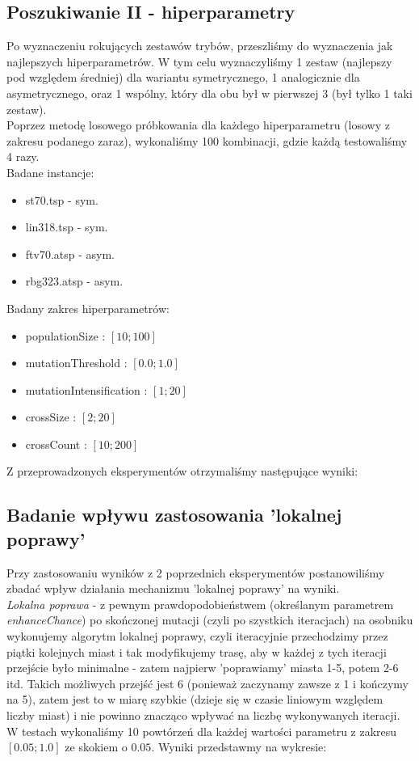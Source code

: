 \documentclass{article}
\begin{document}
\subsection{Poszukiwanie II - hiperparametry}
Po wyznaczeniu rokujących zestawów trybów, przeszliśmy do wyznaczenia jak najlepszych hiperparametrów. W tym celu wyznaczyliśmy 1 zestaw (najlepszy pod względem średniej) dla wariantu symetrycznego, 1 analogicznie dla asymetrycznego, oraz 1 wspólny, który dla obu był w pierwszej 3 (był tylko 1 taki zestaw).\\
Poprzez metodę losowego próbkowania dla każdego hiperparametru (losowy z zakresu podanego zaraz), wykonaliśmy 100 kombinacji, gdzie każdą testowaliśmy 4 razy.\\
Badane instancje:
\begin{itemize}
	\item st70.tsp - sym.
	\item lin318.tsp - sym.
	\item ftv70.atsp - asym.
	\item rbg323.atsp - asym.
\end{itemize}
Badany zakres hiperparametrów:
\begin{itemize}
	\item populationSize : $[10 ; 100]$
	\item mutationThreshold : $[0.0 ; 1.0]$
	\item mutationIntensification : $[1 ; 20]$
	\item crossSize : $[2 ; 20]$
	\item crossCount : $[10 ; 200]$
\end{itemize}
Z przeprowadzonych eksperymentów otrzymaliśmy następujące wyniki:

\subsection{Badanie wpływu zastosowania 'lokalnej poprawy'}
Przy zastosowaniu wyników z 2 poprzednich eksperymentów postanowiliśmy zbadać wpływ działania mechanizmu 'lokalnej poprawy' na wyniki.\\
\textit{Lokalna poprawa} - z pewnym prawdopodobieństwem (określanym parametrem \textit{enhanceChance}) po skończonej mutacji (czyli po szystkich iteracjach) na osobniku wykonujemy algorytm lokalnej poprawy, czyli iteracyjnie przechodzimy przez piątki kolejnych miast i tak modyfikujemy trasę, aby w każdej z tych iteracji przejście było minimalne - zatem najpierw 'poprawiamy' miasta 1-5, potem 2-6 itd. Takich możliwych przejść jest 6 (ponieważ zaczynamy zawsze z 1 i kończymy na 5), zatem jest to w miarę szybkie (dzieje się w czasie liniowym względem liczby miast) i nie powinno znacząco wpływać na liczbę wykonywanych iteracji.\\
W testach wykonaliśmy 10 powtórzeń dla każdej wartości parametru z zakresu $[0.05 ; 1.0]$ ze skokiem o $0.05$. Wyniki przedstawmy na wykresie:
\end{document}
